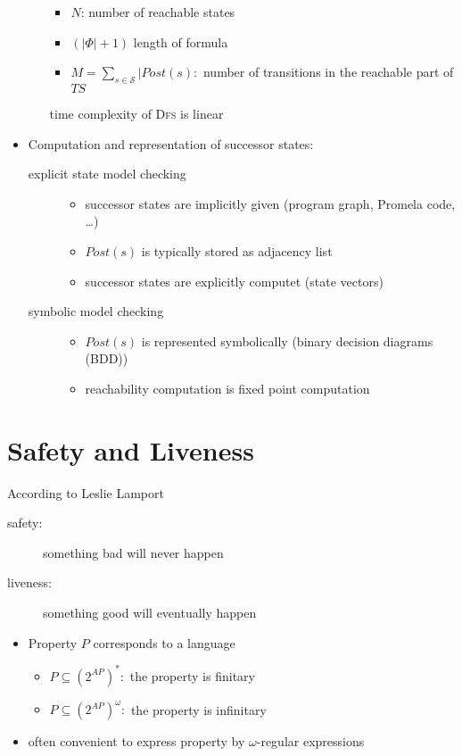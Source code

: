 \documentclass[a4paper, 10pt]{article}
\begin{document}
\begin{itemize}
\begin{itemize}
        \begin{itemize}
            \item $N$: number of reachable states
            \item $(|\Phi|+1)$ length of formula
            \item $M=\sum_{s\in\mathcal{S}}|Post(s):$ number of transitions in the reachable part of $TS$
        \end{itemize}
        \follows time complexity of \textsc{Dfs} is linear
    \end{itemize}
    \item Computation and representation of successor states:
    \begin{description}
        \item[explicit state model checking]
        \begin{itemize}
            \item successor states are implicitly given (program graph, Promela code, \dots)
            \item $Post(s)$ is typically stored as adjacency list
            \item successor states are explicitly computet (state vectors)
        \end{itemize}
        \item[symbolic model checking]
        \begin{itemize}
            \item $Post(s)$ is represented symbolically (binary decision diagrams (BDD))
            \item reachability computation is fixed point computation
        \end{itemize}
    \end{description}
\end{itemize}

\section*{Safety and Liveness}
According to Leslie Lamport
\begin{description}
    \item[safety:] something bad will never happen
    \item[liveness:] something good will eventually happen
\end{description}
\begin{itemize}
    \item Property $P$ corresponds to a language
    \begin{itemize}
        \item $P\subseteq (2^{AP})^*:$ the property is finitary
        \item $P\subseteq (2^{AP})^\omega:$ the property is infinitary
    \end{itemize}
    \item often convenient to express property by $\omega$-regular expressions
\end{itemize}
\end{document}
